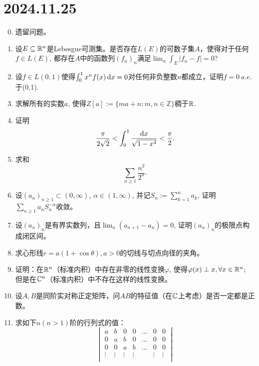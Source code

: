 \section*{2024.11.25}
\begin{enumerate}\setcounter{enumi}{-1}
    \item 遗留问题。
    \item 设$E\subseteq \mathbb{R}^n$是Lebesgue可测集。是否存在$L(E)$的可数子集$A$，使得对于任何$f\in L(E)$, 都存在$A$中的函数列$(f_n)_n$满足$\lim_n \int_E |f_n-f|=0$?
    \item 设$f\in L(0,1)$使得$\int_{0}^{1} x^nf(x)\mathop{}\!\mathrm{d} x=0$对任何非负整数$n$都成立，证明$f=0\ a.e.$ 于(0,1).
    \item 求解所有的实数$a$, 使得$Z[a]:=\{ma+n\colon m,n\in\mathbb{Z}\}$稠于$\mathbb{R}$.
    \item 证明\begin{equation*}
        \frac{\pi}{2\sqrt{2}}<\int_{0}^{1}\frac{\mathop{}\!\mathrm{d} x}{\sqrt{1-x^4}}<\frac{\pi}{2}.
    \end{equation*}
    \item 求和\begin{equation*}
        \sum_{n\geqslant 1}\frac{n^2}{2^n}.
    \end{equation*}
    \item 设$(a_n)_{n\geqslant 1}\subset (0,\infty)$, $\alpha\in (1,\infty)$, 并记$S_n:=\sum_{k=1}^{n} a_k$, 证明$\sum_{n\geqslant 1}a_nS_n^{-\alpha}$收敛。
    \item 设$(a_n)_{n}$是有界实数列，且$\lim_{n}(a_{n+1}-a_n)=0$, 证明$(a_n)_n$的极限点构成闭区间。
    \item 求心形线$r=a(1+\cos \theta),a>0$的切线与切点向径的夹角。
    \item 证明：在$\mathbb{R}^n$（标准内积）中存在非零的线性变换$\varphi$, 使得$\varphi(x)\perp x,\forall x\in \mathbb{R}^n$; 但是在$\mathbb{C}^n$（标准内积）中不存在这样的线性变换。
    \item 设$A, B$是同阶实对称正定矩阵，问$AB$的特征值（在$\mathbb{C}$上考虑）是否一定都是正数。
    \item 求如下$n(n>1)$阶的行列式的值：
    \begin{equation*}
        \begin{vmatrix}
            a & b & 0 & 0 & \dots & 0 & 0 \\
            0 & a & b & 0 & \dots & 0 & 0 \\
            0 & 0 & a & b & \dots & 0 & 0 \\
            \vdots & \vdots & \vdots & \vdots & & \vdots & \vdots \\

\end{vmatrix}
\end{equation*}
\end{enumerate}
